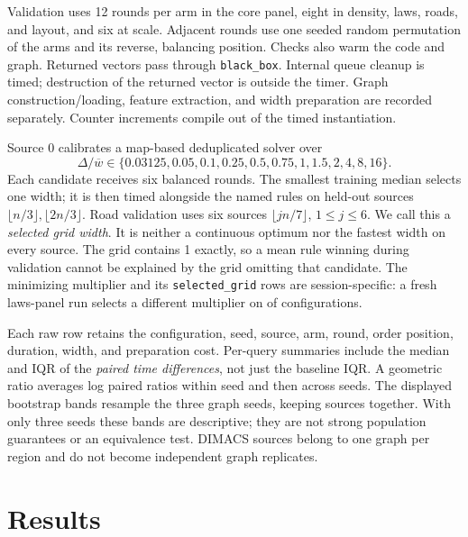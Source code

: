 \documentclass[11pt]{article}
\newcommand{\meanw}{\overline{w}}
\newcommand{\code}[1]{\texttt{#1}}
\begin{document}
Validation uses 12 rounds per arm in the core panel, eight in density, laws,
roads, and layout, and six at scale. Adjacent rounds use one seeded random
permutation of the arms and its reverse, balancing position. Checks also warm
the code and graph. Returned vectors pass through \code{black\_box}. Internal
queue cleanup is timed; destruction of the returned vector is outside the timer.
Graph construction/loading, feature extraction, and width preparation are recorded
separately. Counter increments compile out of the timed instantiation.

Source 0 calibrates a map-based deduplicated solver over
\[
 \Delta/\meanw\in\{0.03125,0.05,0.1,0.25,0.5,0.75,1,1.5,2,4,8,16\}.
\]
Each candidate receives six balanced rounds. The smallest training median selects
one width; it is then timed alongside the named rules on held-out sources
$\lfloor n/3\rfloor,\lfloor2n/3\rfloor$. Road validation uses six sources
$\lfloor jn/7\rfloor$, $1\le j\le6$. We call this a \emph{selected grid width}.
It is neither a continuous optimum nor the fastest width on every source. The
grid contains 1 exactly, so a mean rule winning during validation cannot be
explained by the grid omitting that candidate.
The minimizing multiplier and its \code{selected\_grid} rows are session-specific:
a fresh laws-panel run selects a different multiplier on \SelectionChanges{} of
\SelectionCases{} configurations.

Each raw row retains the configuration, seed, source, arm, round, order position,
duration, width, and preparation cost. Per-query summaries include the median
and IQR of the \emph{paired time differences}, not just the baseline IQR. A
geometric ratio averages log paired ratios within seed and then across seeds.
The displayed bootstrap bands resample the three graph seeds, keeping sources
together. With only three seeds these bands are descriptive; they are not strong
population guarantees or an equivalence test. DIMACS sources belong to one graph
per region and do not become independent graph replicates.

\section{Results}
\end{document}
